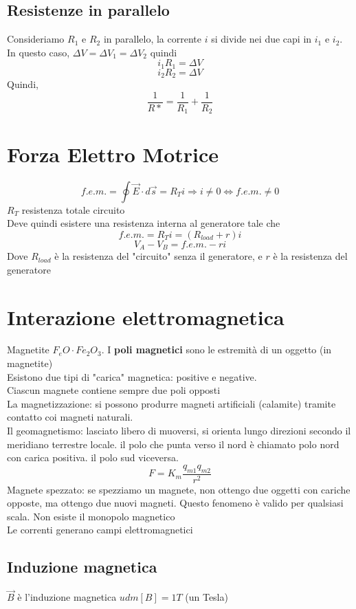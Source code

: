 \documentclass[a4paper]{report}
\begin{document}
  \subsection{Resistenze in parallelo}
  Consideriamo $R_1$ e $R_2$ in parallelo, la corrente $i$ si divide nei due capi in $i_1$ e $i_2$. In questo caso, $\Delta V = \Delta V_1 = \Delta V_2$ quindi
  \[ i_1 R_1 = \Delta V \]
  \[ i_2 R_2 = \Delta V \]
  Quindi,
  \[ \frac{1}{R*} = \frac{1}{R_1} + \frac{1}{R_2} \]

  \section{Forza Elettro Motrice}
  \[ f.e.m. = \oint \vec{E} \cdot d\vec{s} = R_T i \Rightarrow i \neq 0 \iff f.e.m. \neq 0\]
  $R_T$ resistenza totale circuito\\
  Deve quindi esistere una resistenza interna al generatore tale che
  \[ f.e.m. = R_T i = (R_{load} + r)i \]
  \[ V_A - V_B = f.e.m. -ri \]
  Dove $R_{load}$ è la resistenza del "circuito" senza il generatore, e $r$ è la resistenza del generatore

  \section{Interazione elettromagnetica}
  Magnetite $F_eO \cdot Fe_2O_3$. I \textbf{poli magnetici} sono le estremità di un oggetto (in magnetite)\\
  Esistono due tipi di "carica" magnetica: positive e negative.\\
  Ciascun magnete contiene sempre due poli opposti\\
  La magnetizzazione: si possono produrre magneti artificiali (calamite) tramite contatto coi magneti naturali.\\
  Il geomagnetismo: lasciato libero di muoversi, si orienta lungo direzioni secondo il meridiano terrestre locale. il polo che punta verso il nord è chiamato polo nord con carica positiva. il polo sud viceversa.\\
  \[F = K_m \frac{q_{m1}q_{m2}}{r^2}\]
  Magnete spezzato: se spezziamo un magnete, non ottengo due oggetti con cariche opposte, ma ottengo due nuovi magneti. Questo fenomeno è valido per qualsiasi scala. Non esiste il monopolo magnetico\\
  Le correnti generano campi elettromagnetici
  \subsection{Induzione magnetica}
  $\vec{B}$ è l'induzione magnetica $udm[B] = 1T$ (un Tesla)
\end{document}
